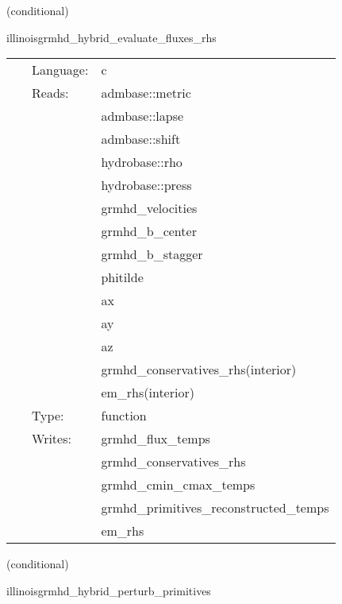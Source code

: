 \documentclass{article}
\begin{document}
\vspace{5mm}

   (conditional) 

\hspace{5mm} illinoisgrmhd\_hybrid\_evaluate\_fluxes\_rhs 

\hspace{5mm}{\it hybrid version of illinoisgrmhd\_evaluate\_fluxes\_rhs } 


\hspace{5mm}

 \begin{tabular*}{160mm}{cll} 
~ & Language:  & c \\ 
~ & Reads:  & admbase::metric \\ 
~& ~ &admbase::lapse\\ 
~& ~ &admbase::shift\\ 
~& ~ &hydrobase::rho\\ 
~& ~ &hydrobase::press\\ 
~& ~ &grmhd\_velocities\\ 
~& ~ &grmhd\_b\_center\\ 
~& ~ &grmhd\_b\_stagger\\ 
~& ~ &phitilde\\ 
~& ~ &ax\\ 
~& ~ &ay\\ 
~& ~ &az\\ 
~& ~ &grmhd\_conservatives\_rhs(interior)\\ 
~& ~ &em\_rhs(interior)\\ 
~ & Type:  & function \\ 
~ & Writes:  & grmhd\_flux\_temps \\ 
~& ~ &grmhd\_conservatives\_rhs\\ 
~& ~ &grmhd\_cmin\_cmax\_temps\\ 
~& ~ &grmhd\_primitives\_reconstructed\_temps\\ 
~& ~ &em\_rhs\\ 
\end{tabular*} 


\vspace{5mm}

   (conditional) 

\hspace{5mm} illinoisgrmhd\_hybrid\_perturb\_primitives 

\hspace{5mm}{\it hybrid version of illinoisgrmhd\_perturb\_primitives } 
\end{document}

